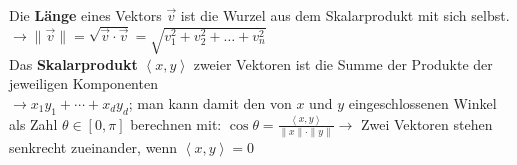 Die \textbf{Länge} eines Vektors \(\vec{v}\) ist die Wurzel aus dem Skalarprodukt mit sich selbst.\\
\(\rightarrow \|\vec{v}\| = \sqrt{\vec{v} \cdot \vec{v}} = \sqrt{v_1^2 + v_2^2 + \dots + v_n^2}\)\\

Das \textbf{Skalarprodukt} \(\left\langle x, y\right\rangle \) zweier Vektoren ist die Summe der Produkte der jeweiligen Komponenten\\
\(\rightarrow x_1y_1+\cdots + x_dy_d\); man kann damit den von \(x\) und \(y\) eingeschlossenen Winkel als Zahl \(\theta \in [0,\pi]\) berechnen mit: \(\cos \theta = \frac{\left\langle x, y\right\rangle}{\|x\|\cdot \|y\|} \rightarrow\) Zwei Vektoren stehen senkrecht zueinander, wenn \(\left\langle x, y\right\rangle = 0\)\\
